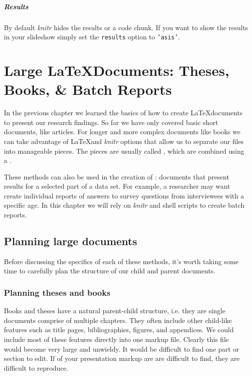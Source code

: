 \documentclass[ChapterTOCs,krantz1]{krantz}\usepackage{graphicx, color}
\begin{document}
\paragraph{Results}

By default {\emph{knitr}} hides the results or a code chunk. If you want to show the results in your slideshow simply set the {\tt{results}} option to {\tt{'asis'}}.




\chapter{Large \LaTeX Documents: Theses, Books, \& Batch Reports}\label{LargeDocs}

In the previous chapter we learned the basics of how to create \LaTeX documents to present our research findings. So far we have only covered basic short documents, like articles. For longer and more complex documents like books we can take advantage of \LaTeX and {\emph{knitr}} options that allow us to separate our files into manageable pieces. The pieces are usually called , which are combined using a .

These methods can also be used in the creation of : documents that present results for a selected part of a data set. For example, a researcher may want create individual reports of answers to survey questions from interviewees with a specific age. In this chapter we will rely on {\emph{knitr}} and shell scripts to create batch reports. 

\section{Planning large documents}

Before discussing the specifics of each of these methods, it's worth taking some time to carefully plan the structure of our child and parent documents.

\subsection{Planning theses and books}

Books and theses have a natural parent-child structure, i.e. they are single documents comprise of multiple chapters. They often include other child-like features such as title pages, bibliographies, figures, and appendices. We could include most of these features directly into one markup file. Clearly this file would become very large and unwieldy. It would be difficult to find one part or section to edit. If of your presentation markup are are difficult to find, they are difficult to reproduce.  
\end{document}
